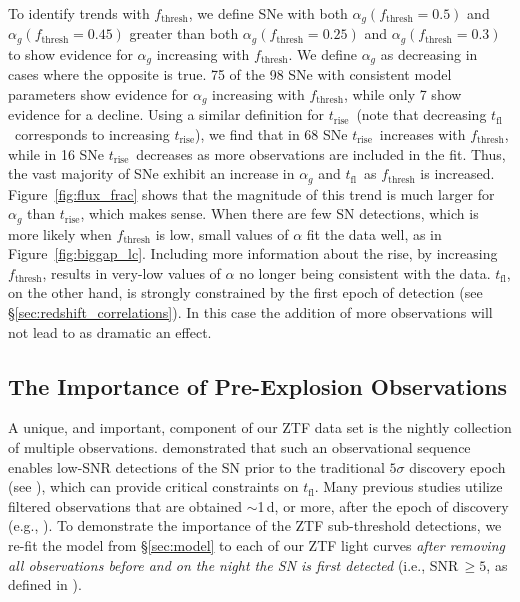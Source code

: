 \documentclass[twocolumn]{./aastex63}
\newcommand{\tfl}{$t_\mathrm{fl}$}
\newcommand{\trise}{$t_\mathrm{rise}$}
\begin{document}
To identify trends with $f_\mathrm{thresh}$, we define SNe with both
$\alpha_g(f_\mathrm{thresh} = 0.5)$ and $\alpha_g(f_\mathrm{thresh} = 0.45)$
greater than both $\alpha_g(f_\mathrm{thresh} = 0.25)$ and
$\alpha_g(f_\mathrm{thresh} = 0.3)$ to show evidence for $\alpha_g$ increasing
with $f_\mathrm{thresh}$. We define $\alpha_g$ as decreasing in cases where
the opposite is true. 75 of the 98 SNe with consistent model parameters show
evidence for $\alpha_g$ increasing with $f_\mathrm{thresh}$, while only 7 show
evidence for a decline. Using a similar definition for \trise\ (note that
decreasing \tfl\ corresponds to increasing \trise), we find that in 68 SNe
\trise\ increases with $f_\mathrm{thresh}$, while in 16 SNe \trise\ decreases
as more observations are included in the fit. Thus, the vast majority of SNe
exhibit an increase in $\alpha_g$ and \tfl\ as $f_\mathrm{thresh}$ is
increased. Figure~\ref{fig:flux_frac} shows that the magnitude of this trend
is much larger for $\alpha_g$ than \trise, which makes sense. When there are
few SN detections, which is more likely when $f_\mathrm{thresh}$ is low, small
values of $\alpha$ fit the data well, as in Figure~\ref{fig:biggap_lc}.
Including more information about the rise, by increasing $f_\mathrm{thresh}$,
results in very-low values of $\alpha$ no longer being consistent with the
data. \tfl, on the other hand, is strongly constrained by the first epoch of
detection (see \S\ref{sec:redshift_correlations}). In this case the addition
of more observations will not lead to as dramatic an effect.

\subsection{The Importance of Pre-Explosion Observations}\label{sec:pre_explosion}

A unique, and important, component of our ZTF data set is the nightly
collection of multiple observations. \citet{Yao19} demonstrated that such an
observational sequence enables low-SNR detections of the SN prior to the
traditional $5\sigma$ discovery epoch (see \citealt{Masci19}), which can
provide critical constraints on \tfl. Many previous studies utilize filtered
observations that are obtained $\sim$1\,d, or more, after the epoch of
discovery (e.g., \citealt{Riess99a,Aldering00,Ganeshalingam10,Zheng17a}). To
demonstrate the importance of the ZTF sub-threshold detections, we re-fit the
model from \S\ref{sec:model} to each of our ZTF light curves \textit{after
removing all observations before and on the night the SN is first detected}
(i.e., SNR\,$\geq 5$, as defined in \citealt{Yao19}).
\end{document}
